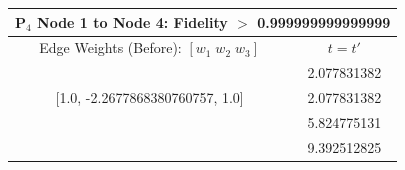 \documentclass[reprint, aps, 12pt, floatfix]{revtex4-2}
\begin{document}
\begin{center}
    \begin{tabular}{||c c||}
        \multicolumn{2}{c}{P$_4$ Node 1 to Node 4: Fidelity $>$ 0.999999999999999}\\
        \hline
        Edge Weights (Before): $[w_1 \; w_2 \; w_3]$&$t=t'$\\
        \hline
        [1.0, -2.2677868380760757, 1.0]&2.077831382\\

        [1.0, -2.2677868380760757, 1.0]&2.077831382\\
        \hline
        [1.0, -7.281358514018219, 1.0]&5.824775131\\
        \hline
        [1.0, 0.1672484025560938, 1.0]&9.392512825\\
        \hline
    \end{tabular}
\end{center}
\end{document}
